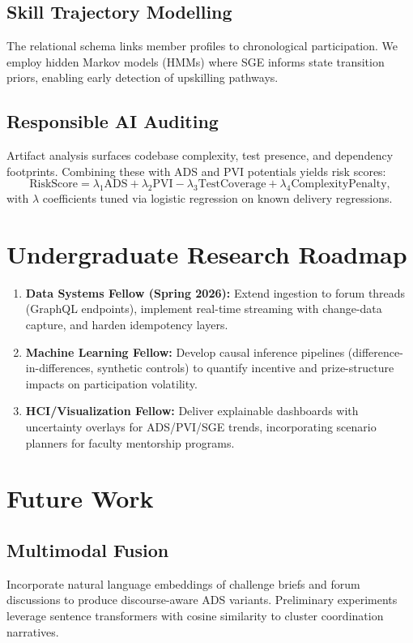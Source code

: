 \documentclass[11pt]{article}
\begin{document}
\subsection{Skill Trajectory Modelling}
The relational schema links member profiles to chronological participation. We employ hidden Markov models (HMMs) where SGE informs state transition priors, enabling early detection of upskilling pathways.

\subsection{Responsible AI Auditing}
Artifact analysis surfaces codebase complexity, test presence, and dependency footprints. Combining these with ADS and PVI potentials yields risk scores:
\[
  \mathrm{RiskScore} = \lambda_1 \mathrm{ADS} + \lambda_2 \mathrm{PVI} - \lambda_3 \mathrm{TestCoverage} + \lambda_4 \mathrm{ComplexityPenalty},
\]
with $\lambda$ coefficients tuned via logistic regression on known delivery regressions.

\section{Undergraduate Research Roadmap}
\begin{enumerate}[leftmargin=*]
  \item \textbf{Data Systems Fellow (Spring 2026):} Extend ingestion to forum threads (GraphQL endpoints), implement real-time streaming with change-data capture, and harden idempotency layers.
  \item \textbf{Machine Learning Fellow:} Develop causal inference pipelines (difference-in-differences, synthetic controls) to quantify incentive and prize-structure impacts on participation volatility.
  \item \textbf{HCI/Visualization Fellow:} Deliver explainable dashboards with uncertainty overlays for ADS/PVI/SGE trends, incorporating scenario planners for faculty mentorship programs.
\end{enumerate}

\section{Future Work}
\subsection{Multimodal Fusion}
Incorporate natural language embeddings of challenge briefs and forum discussions to produce discourse-aware ADS variants. Preliminary experiments leverage sentence transformers with cosine similarity to cluster coordination narratives.
\end{document}
